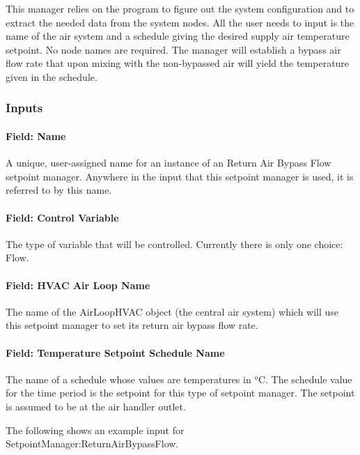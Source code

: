This manager relies on the program to figure out the system configuration and to extract the needed data from the system nodes. All the user needs to input is the name of the air system and a schedule giving the desired supply air temperature setpoint. No node names are required. The manager will establish a bypass air flow rate that upon mixing with the non-bypassed air will yield the temperature given in the schedule.

\subsubsection{Inputs}\label{inputs-12-016}

\paragraph{Field: Name}\label{field-name-12-010}

A unique, user-assigned name for an instance of an Return Air Bypass Flow setpoint manager. Anywhere in the input that this setpoint manager is used, it is referred to by this name.

\paragraph{Field: Control Variable}\label{field-control-variable-12}

The type of variable that will be controlled. Currently there is only one choice: Flow.

\paragraph{Field: HVAC Air Loop Name}\label{field-hvac-air-loop-name-2}

The name of the AirLoopHVAC object (the central air system) which will use this setpoint manager to set its return air bypass flow rate.

\paragraph{Field: Temperature Setpoint Schedule Name}\label{field-temperature-setpoint-schedule-name}

The name of a schedule whose values are temperatures in \(^{o}\)C. The schedule value for the time period is the setpoint for this type of setpoint manager. The setpoint is assumed to be at the air handler outlet.

The following shows an example input for SetpointManager:ReturnAirBypassFlow.

